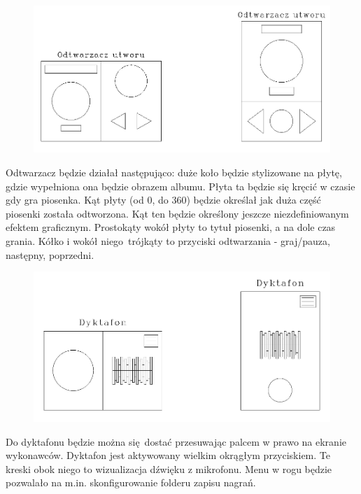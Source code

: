 \begin{figure}[H]
	\centering
	\includegraphics[width=1\linewidth]{images/mockup2_odtwarzacz}
	\caption{}
	\label{fig:mockup2odtwarzacz}
\end{figure}


Odtwarzacz będzie działał następująco: duże koło będzie stylizowane na płytę, gdzie wypełniona ona będzie obrazem albumu. Płyta ta będzie się kręcić w czasie gdy gra piosenka. Kąt płyty (od 0\degree, do 360\degree) będzie określał jak duża część piosenki została odtworzona. Kąt ten będzie określony jeszcze niezdefiniowanym efektem graficznym. Prostokąty wokół płyty to tytuł piosenki, a na dole czas grania. Kółko i wokół niego trójkąty to przyciski odtwarzania - graj/pauza, następny, poprzedni. 

\begin{figure}[H]
	\centering
	\includegraphics[width=1\linewidth]{images/mockup2_dyktafon}
	\caption{}
	\label{fig:mockup2dyktafon}
\end{figure}


Do dyktafonu będzie można się dostać przesuwając palcem w prawo na ekranie wykonawców. Dyktafon jest aktywowany wielkim okrągłym przyciskiem. Te kreski obok niego to wizualizacja dźwięku z mikrofonu. Menu w rogu będzie pozwalało na m.in. skonfigurowanie folderu zapisu nagrań.
